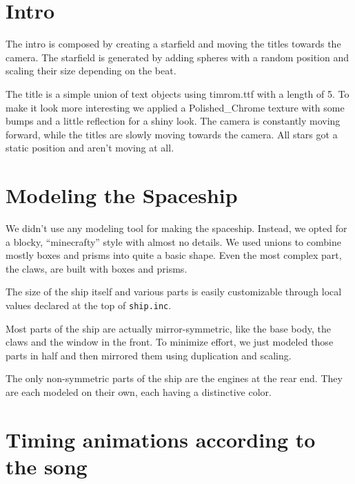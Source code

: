 \documentclass[a4paper, 12pt]{scrartcl}
\begin{document}
    \section{Intro}
    The intro is composed by creating a starfield and moving the titles towards the camera. The starfield is generated by adding spheres with a random position and scaling their size depending on the beat. 

    The title is a simple union of text objects using timrom.ttf with a length of 5. To make it look more interesting we applied a Polished\_Chrome texture with some bumps and a little reflection for a shiny look. The camera is constantly moving forward, while the titles are slowly moving towards the camera. All stars got a static position and aren't moving at all.

    \section{Modeling the Spaceship}
    We didn't use any modeling tool for making the spaceship. Instead, we opted for a blocky, ``minecrafty'' style with almost no details. We used unions to combine mostly boxes and prisms into quite a basic shape. Even the most complex part, the claws, are built with boxes and prisms.

    The size of the ship itself and various parts is easily customizable through local values declared at the top of \texttt{ship.inc}.

    Most parts of the ship are actually mirror-symmetric, like the base body, the claws and the window in the front. To minimize effort, we just modeled those parts in half and then mirrored them using duplication and scaling.

    The only non-symmetric parts of the ship are the engines at the rear end. They are each modeled on their own, each having a distinctive color.

    \section{Timing animations according to the song}
\end{document}
